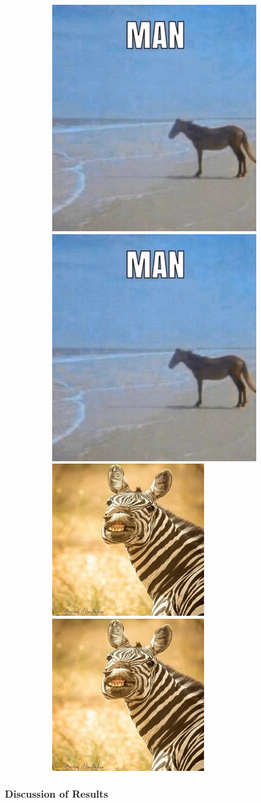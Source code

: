 \documentclass[12pt, fleqn, titlepage]{article}
\newcommand\skipper{1.4pt}
\begin{document}
\begin{figure}[H]
\begin{subfigure}[b]{0.8\textwidth}
		\centering
		\includegraphics[width=0.15\linewidth]{imgs/temp_horse}
		\hskip\skipper
		\includegraphics[width=0.15\linewidth]{imgs/temp_horse}
		\hskip\skipper
		\includegraphics[width=0.15\linewidth]{imgs/temp_zebra}
		\hskip\skipper
		\includegraphics[width=0.15\linewidth]{imgs/temp_zebra}
	\end{subfigure}
\end{figure}


\subsubsection{Discussion of Results}
\end{document}
